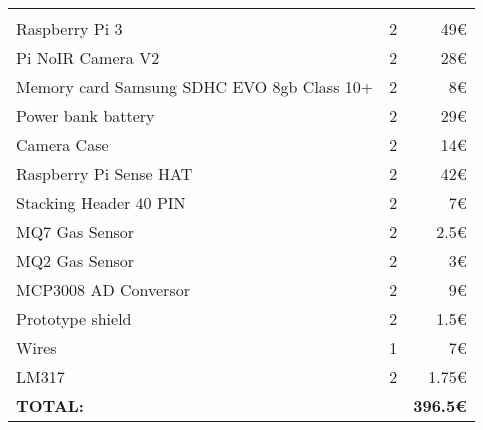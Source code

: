 \begin{tabular}{ |p{}P{.1\textwidth}r|}
	\hline
	 \\
	\hline
	\hline
		& 	&  \\
	\hline
	Raspberry Pi 3 					& 2 	& 49\euro{} \\ 
	\hline
	Pi NoIR Camera V2 				& 2 	& 28\euro{} \\ 
	\hline
	Memory card Samsung SDHC
	EVO 8gb Class 10+ 				& 2		& 8\euro{} \\ 
	\hline
	Power bank battery 				& 2 	& 29\euro{} \\ 
	\hline
	Camera Case		 				& 2 	& 14\euro{} \\ 
	\hline
	Raspberry Pi Sense HAT			& 2 	& 42\euro{} \\ 
	\hline
	Stacking Header 40 PIN 			& 2 	& 7\euro{} \\ 
	\hline
	MQ7 Gas Sensor		 			& 2 	& 2.5\euro{} \\ 
	\hline
	MQ2 Gas Sensor 					& 2 	& 3\euro{} \\ 
	\hline
	MCP3008 AD Conversor			& 2 	& 9\euro{} \\ 
	\hline
	Prototype shield  				& 2 	& 1.5\euro{} \\ 
	\hline
	Wires 							& 1 	& 7\euro{} \\ 
	\hline
	LM317 							& 2 	& 1.75\euro{} \\ 
	
	\Xhline{2\arrayrulewidth}
	\textbf{TOTAL:} &  		& \textbf{396.5\euro{}} \\ 
	\hline

\end{tabular}
